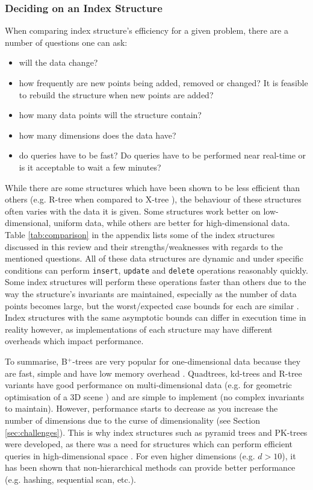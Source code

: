 \subsubsection{Deciding on an Index Structure}
\label{sec:structure-decision}

When comparing index structure's efficiency for a given problem, there are a number of questions one can ask:
\begin{itemize}
	\item will the data change?
	\item how frequently are new points being added, removed or changed? It is feasible to rebuild the structure when new points are added?
	\item how many data points will the structure contain?
	\item how many dimensions does the data have?
	\item do queries have to be fast? Do queries have to be performed near real-time or is it acceptable to wait a few minutes?
\end{itemize}

While there are some structures which have been shown to be less efficient than others (e.g. R-tree when compared to X-tree \cite{x-tree}), the behaviour of these structures often varies with the data it is given. Some structures work better on low-dimensional, uniform data, while others are better for high-dimensional data. Table \ref{tab:comparison} in the appendix lists some of the index structures discussed in this review and their strengths/weaknesses with regards to the mentioned questions. All of these data structures are dynamic and under specific conditions can perform \texttt{insert}, \texttt{update} and \texttt{delete} operations reasonably quickly. Some index structures will perform these operations faster than others due to the way the structure's invariants are maintained, especially as the number of data points becomes large, but the worst/expected case bounds for each are similar \cite{ubiquitous-btree, r-tree, kd-tree, pyramid-tree, pk-tree, skip-quadtree, rsr-tree, quadtreap, splay-quadtree}. Index structures with the same asymptotic bounds can differ in execution time in reality however, as implementations of each structure may have different overheads which impact performance.

To summarise, B${}^{+}$-trees are very popular for one-dimensional data because they are fast, simple and have low memory overhead \cite{ubiquitous-btree}. Quadtrees, kd-trees and R-tree variants have good performance on multi-dimensional data (e.g. for geometric optimisation of a 3D scene \cite{kd-tree-gpu}) and are simple to implement (no complex invariants to maintain). However, performance starts to decrease as you increase the number of dimensions due to the curse of dimensionality (see Section \ref{sec:challenges}). This is why index structures such as pyramid trees and PK-trees were developed, as there was a need for structures which can perform efficient queries in high-dimensional space \cite{pk-tree, pyramid-tree}. For even higher dimensions (e.g. $d > 10$), it has been shown that non-hierarchical methods can provide better performance (e.g. hashing, sequential scan, etc.).
